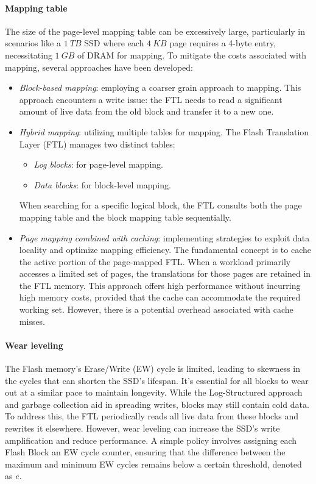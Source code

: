 \paragraph*{Mapping table}
The size of the page-level mapping table can be excessively large, particularly in scenarios like a $1\:TB$ SSD where each $4\:KB$ page requires a 4-byte entry, necessitating $1\:GB$ of DRAM for mapping. 
To mitigate the costs associated with mapping, several approaches have been developed:
\begin{itemize}
    \item \textit{Block-based mapping}: employing a coarser grain approach to mapping.
        This approach encounters a write issue: the FTL needs to read a significant amount of live data from the old block and transfer it to a new one.
    \item \textit{Hybrid mapping}: utilizing multiple tables for mapping.
        The Flash Translation Layer (FTL) manages two distinct tables:
        \begin{itemize}
            \item \textit{Log blocks}: for page-level mapping.
            \item \textit{Data blocks}: for block-level mapping.
        \end{itemize}
        When searching for a specific logical block, the FTL consults both the page mapping table and the block mapping table sequentially.
    \item \textit{Page mapping combined with caching}: implementing strategies to exploit data locality and optimize mapping efficiency.
        The fundamental concept is to cache the active portion of the page-mapped FTL. 
        When a workload primarily accesses a limited set of pages, the translations for those pages are retained in the FTL memory. 
        This approach offers high performance without incurring high memory costs, provided that the cache can accommodate the required working set. 
        However, there is a potential overhead associated with cache misses.
\end{itemize}

\paragraph*{Wear leveling}
The Flash memory's Erase/Write (EW) cycle is limited, leading to skewness in the cycles that can shorten the SSD's lifespan. 
It's essential for all blocks to wear out at a similar pace to maintain longevity.
While the Log-Structured approach and garbage collection aid in spreading writes, blocks may still contain cold data. 
To address this, the FTL periodically reads all live data from these blocks and rewrites it elsewhere. 
However, wear leveling can increase the SSD's write amplification and reduce performance. 
A simple policy involves assigning each Flash Block an EW cycle counter, ensuring that the difference between the maximum and minimum EW cycles remains below a certain threshold, denoted as $e$.

